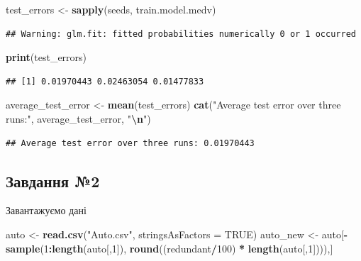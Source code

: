 \documentclass[
]{article}
\newenvironment{Shaded}{\begin{snugshade}}{\end{snugshade}}
\newcommand{\AttributeTok}[1]{\textcolor[rgb]{0.13,0.29,0.53}{#1}}
\newcommand{\ConstantTok}[1]{\textcolor[rgb]{0.56,0.35,0.01}{#1}}
\newcommand{\DecValTok}[1]{\textcolor[rgb]{0.00,0.00,0.81}{#1}}
\newcommand{\FunctionTok}[1]{\textcolor[rgb]{0.13,0.29,0.53}{\textbf{#1}}}
\newcommand{\NormalTok}[1]{#1}
\newcommand{\OtherTok}[1]{\textcolor[rgb]{0.56,0.35,0.01}{#1}}
\newcommand{\SpecialCharTok}[1]{\textcolor[rgb]{0.81,0.36,0.00}{\textbf{#1}}}
\newcommand{\StringTok}[1]{\textcolor[rgb]{0.31,0.60,0.02}{#1}}
\begin{document}
\begin{Shaded}
\begin{Highlighting}[]
\NormalTok{test\_errors }\OtherTok{\textless{}{-}} \FunctionTok{sapply}\NormalTok{(seeds, train.model.medv)}
\end{Highlighting}
\end{Shaded}

\begin{verbatim}
## Warning: glm.fit: fitted probabilities numerically 0 or 1 occurred
\end{verbatim}

\begin{Shaded}
\begin{Highlighting}[]
\FunctionTok{print}\NormalTok{(test\_errors)}
\end{Highlighting}
\end{Shaded}

\begin{verbatim}
## [1] 0.01970443 0.02463054 0.01477833
\end{verbatim}

\begin{Shaded}
\begin{Highlighting}[]
\NormalTok{average\_test\_error }\OtherTok{\textless{}{-}} \FunctionTok{mean}\NormalTok{(test\_errors)}
\FunctionTok{cat}\NormalTok{(}\StringTok{"Average test error over three runs:"}\NormalTok{, average\_test\_error, }\StringTok{"}\SpecialCharTok{\textbackslash{}n}\StringTok{"}\NormalTok{)}
\end{Highlighting}
\end{Shaded}

\begin{verbatim}
## Average test error over three runs: 0.01970443
\end{verbatim}

\subsection{Завдання
№2}\label{ux437ux430ux432ux434ux430ux43dux43dux44f-2}

Завантажуємо дані

\begin{Shaded}
\begin{Highlighting}[]
\NormalTok{auto }\OtherTok{\textless{}{-}} \FunctionTok{read.csv}\NormalTok{(}\StringTok{"Auto.csv"}\NormalTok{, }\AttributeTok{stringsAsFactors =} \ConstantTok{TRUE}\NormalTok{)}
\NormalTok{auto\_new }\OtherTok{\textless{}{-}}\NormalTok{ auto[}\SpecialCharTok{{-}}\FunctionTok{sample}\NormalTok{(}\DecValTok{1}\SpecialCharTok{:}\FunctionTok{length}\NormalTok{(auto[,}\DecValTok{1}\NormalTok{]), }\FunctionTok{round}\NormalTok{((redundant}\SpecialCharTok{/}\DecValTok{100}\NormalTok{) }\SpecialCharTok{*} \FunctionTok{length}\NormalTok{(auto[,}\DecValTok{1}\NormalTok{]))),]}
\end{Highlighting}
\end{Shaded}
\end{document}

